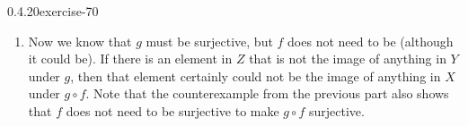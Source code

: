 \documentclass[twoside,11pt,]{book}
\numberwithin{equation}{chapter}
\newcommand{\twoline}[2]{\begin{pmatrix}#1 \\ #2 \end{pmatrix}}
\newcommand{\amp}{&}
\begin{document}
\begin{divisionsolution}{0.4.20}{}{exercise-70}
\begin{enumerate}[label=(\alph*)]
We know that \(f\) must be injective, and \(g\) could or could not be injective. Note that if \(f\) was not injective, then there would be two elements in \(X\) that went to the same element in \(Y\) and that element would need to go to one element in \(Z\), contradicting that \(g\circ f\) was injective. However, consider \(X = \{1,2\}\), \(Y = \{a, b, c\}\) and \(Z = \{5, 6\}\), together with \(f = \twoline{1 \amp 2}{a, b}\) and \(g = \twoline{a \amp b \amp c}{5, 6, 6}\). It is easy to see that \(g \circ f\) is still injective even though \(g\) is not.%
\item\hypertarget{li-916}{}\hypertarget{p-1134}{}%
Now we know that \(g\) must be surjective, but \(f\) does not need to be (although it could be). If there is an element in \(Z\) that is not the image of anything in \(Y\) under \(g\), then that element certainly could not be the image of anything in \(X\) under \(g\circ f\). Note that the counterexample from the previous part also shows that \(f\) does not need to be surjective to make \(g\circ f\) surjective.%
\end{enumerate}
%
\end{divisionsolution}%
\end{document}
